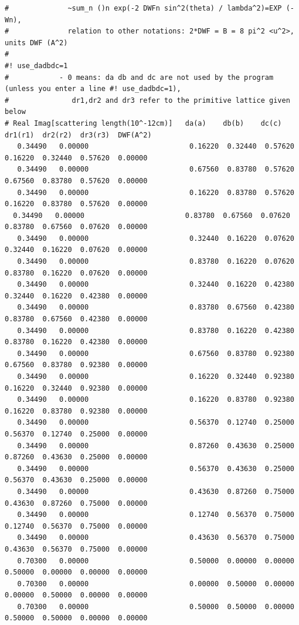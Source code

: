 {\begin{verbatim}
#              ~sum_n ()n exp(-2 DWFn sin^2(theta) / lambda^2)=EXP (-Wn),  
#              relation to other notations: 2*DWF = B = 8 pi^2 <u^2>, units DWF (A^2)
#
#! use_dadbdc=1
#            - 0 means: da db and dc are not used by the program (unless you enter a line #! use_dadbdc=1),
#               dr1,dr2 and dr3 refer to the primitive lattice given below
# Real Imag[scattering length(10^-12cm)]   da(a)    db(b)    dc(c)    dr1(r1)  dr2(r2)  dr3(r3)  DWF(A^2)
   0.34490   0.00000                        0.16220  0.32440  0.57620  0.16220  0.32440  0.57620  0.00000
   0.34490   0.00000                        0.67560  0.83780  0.57620  0.67560  0.83780  0.57620  0.00000
   0.34490   0.00000                        0.16220  0.83780  0.57620  0.16220  0.83780  0.57620  0.00000
  0.34490   0.00000                        0.83780  0.67560  0.07620  0.83780  0.67560  0.07620  0.00000
   0.34490   0.00000                        0.32440  0.16220  0.07620  0.32440  0.16220  0.07620  0.00000
   0.34490   0.00000                        0.83780  0.16220  0.07620  0.83780  0.16220  0.07620  0.00000
   0.34490   0.00000                        0.32440  0.16220  0.42380  0.32440  0.16220  0.42380  0.00000
   0.34490   0.00000                        0.83780  0.67560  0.42380  0.83780  0.67560  0.42380  0.00000
   0.34490   0.00000                        0.83780  0.16220  0.42380  0.83780  0.16220  0.42380  0.00000
   0.34490   0.00000                        0.67560  0.83780  0.92380  0.67560  0.83780  0.92380  0.00000
   0.34490   0.00000                        0.16220  0.32440  0.92380  0.16220  0.32440  0.92380  0.00000
   0.34490   0.00000                        0.16220  0.83780  0.92380  0.16220  0.83780  0.92380  0.00000
   0.34490   0.00000                        0.56370  0.12740  0.25000  0.56370  0.12740  0.25000  0.00000
   0.34490   0.00000                        0.87260  0.43630  0.25000  0.87260  0.43630  0.25000  0.00000
   0.34490   0.00000                        0.56370  0.43630  0.25000  0.56370  0.43630  0.25000  0.00000
   0.34490   0.00000                        0.43630  0.87260  0.75000  0.43630  0.87260  0.75000  0.00000
   0.34490   0.00000                        0.12740  0.56370  0.75000  0.12740  0.56370  0.75000  0.00000
   0.34490   0.00000                        0.43630  0.56370  0.75000  0.43630  0.56370  0.75000  0.00000
   0.70300   0.00000                        0.50000  0.00000  0.00000  0.50000  0.00000  0.00000  0.00000
   0.70300   0.00000                        0.00000  0.50000  0.00000  0.00000  0.50000  0.00000  0.00000
   0.70300   0.00000                        0.50000  0.50000  0.00000  0.50000  0.50000  0.00000  0.00000

\end{verbatim}}

